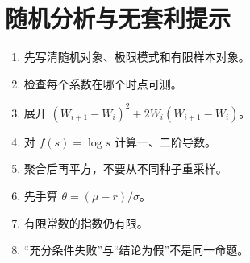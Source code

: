 \chapter{随机分析与无套利提示}
\begin{enumerate}
  \item 先写清随机对象、极限模式和有限样本对象。
  \item 检查每个系数在哪个时点可测。
  \item 展开 $(W_{i+1}-W_i)^2+2W_i(W_{i+1}-W_i)$。
  \item 对 $f(s)=\log s$ 计算一、二阶导数。
  \item 聚合后再平方，不要从不同种子重采样。
  \item 先手算 $\theta=(\mu-r)/\sigma$。
  \item 有限常数的指数仍有限。
  \item “充分条件失败”与“结论为假”不是同一命题。
\end{enumerate}


\MFQMappedDerivativesStochasticHints
